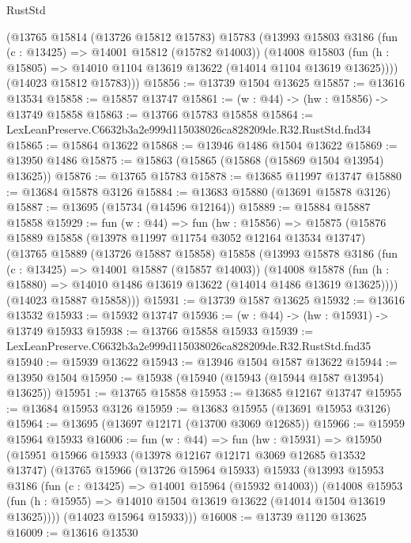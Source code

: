 \begin{lexlean}{RustStd}
\begin{coremodule}
      (@13765
        @15814
        (@13726 @15812 @15783)
        @15783
        (@13993
          @15803
          @3186
          (fun (c : @13425) => @14001 @15812 (@15782 @14003))
          (@14008
            @15803
            (fun (h : @15805) => @14010 @1104 @13619 @13622 (@14014 @1104 @13619 @13625))))
        (@14023 @15812 @15783)))
@15856 := @13739 @1504 @13625
@15857 := @13616 @13534
@15858 := @15857 @13747
@15861 := (w : @44) -> (hw : @15856) -> @13749 @15858
@15863 := @13766 @15783 @15858
@15864 := LexLeanPreserve.C6632b3a2e999d115038026ca828209de.R32.RustStd.fnd34
@15865 := @15864 @13622
@15868 := @13946 @1486 @1504 @13622
@15869 := @13950 @1486
@15875 := @15863 (@15865 (@15868 (@15869 @1504 @13954) @13625))
@15876 := @13765 @15783
@15878 := @13685 @11997 @13747
@15880 := @13684 @15878 @3126
@15884 := @13683 @15880 (@13691 @15878 @3126)
@15887 := @13695 (@15734 (@14596 @12164))
@15889 := @15884 @15887 @15858
@15929 := fun (w : @44) =>
  fun (hw : @15856) =>
  @15875
    (@15876
      @15889
      @15858
      (@13978 @11997 @11754 @3052 @12164 @13534 @13747)
      (@13765
        @15889
        (@13726 @15887 @15858)
        @15858
        (@13993
          @15878
          @3186
          (fun (c : @13425) => @14001 @15887 (@15857 @14003))
          (@14008
            @15878
            (fun (h : @15880) => @14010 @1486 @13619 @13622 (@14014 @1486 @13619 @13625))))
        (@14023 @15887 @15858)))
@15931 := @13739 @1587 @13625
@15932 := @13616 @13532
@15933 := @15932 @13747
@15936 := (w : @44) -> (hw : @15931) -> @13749 @15933
@15938 := @13766 @15858 @15933
@15939 := LexLeanPreserve.C6632b3a2e999d115038026ca828209de.R32.RustStd.fnd35
@15940 := @15939 @13622
@15943 := @13946 @1504 @1587 @13622
@15944 := @13950 @1504
@15950 := @15938 (@15940 (@15943 (@15944 @1587 @13954) @13625))
@15951 := @13765 @15858
@15953 := @13685 @12167 @13747
@15955 := @13684 @15953 @3126
@15959 := @13683 @15955 (@13691 @15953 @3126)
@15964 := @13695 (@13697 @12171 (@13700 @3069 @12685))
@15966 := @15959 @15964 @15933
@16006 := fun (w : @44) =>
  fun (hw : @15931) =>
  @15950
    (@15951
      @15966
      @15933
      (@13978 @12167 @12171 @3069 @12685 @13532 @13747)
      (@13765
        @15966
        (@13726 @15964 @15933)
        @15933
        (@13993
          @15953
          @3186
          (fun (c : @13425) => @14001 @15964 (@15932 @14003))
          (@14008
            @15953
            (fun (h : @15955) => @14010 @1504 @13619 @13622 (@14014 @1504 @13619 @13625))))
        (@14023 @15964 @15933)))
@16008 := @13739 @1120 @13625
@16009 := @13616 @13530

\end{coremodule}
\end{lexlean}

